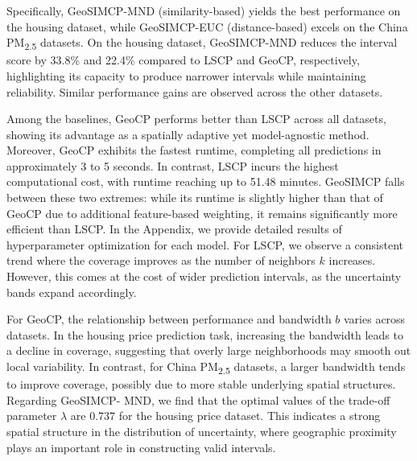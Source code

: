 \documentclass[authoryear,preprint,review,12pt]{elsarticle}
\begin{document}
Specifically, GeoSIMCP-MND (similarity-based) yields the best performance on the housing dataset, while GeoSIMCP-EUC (distance-based) excels on the China PM\textsubscript{2.5} datasets. On the housing dataset, GeoSIMCP-MND reduces the interval score by 33.8\% and 22.4\% compared to LSCP and GeoCP, respectively, highlighting its capacity to produce narrower intervals while maintaining reliability. Similar performance gains are observed across the other datasets.

Among the baselines, GeoCP performs better than LSCP across all datasets, showing its advantage as a spatially adaptive yet model-agnostic method. Moreover, GeoCP exhibits the fastest runtime, completing all predictions in approximately 3 to 5 seconds. In contrast, LSCP incurs the highest computational cost, with runtime reaching up to 51.48 minutes. GeoSIMCP falls between these two extremes: while its runtime is slightly higher than that of GeoCP due to additional feature-based weighting, it remains significantly more efficient than LSCP. In the Appendix, we provide detailed results of hyperparameter optimization for each model. For LSCP, we observe a consistent trend where the coverage improves as the number of neighbors $k$ increases. However, this comes at the cost of wider prediction intervals, as the uncertainty bands expand accordingly.

For GeoCP, the relationship between performance and bandwidth $b$ varies across datasets. In the housing price prediction task, increasing the bandwidth leads to a decline in coverage, suggesting that overly large neighborhoods may smooth out local variability. In contrast, for China PM\textsubscript{2.5} datasets, a larger bandwidth tends to improve coverage, possibly due to more stable underlying spatial structures.
Regarding GeoSIMCP- MND, we find that the optimal values of the trade-off parameter $\lambda$ are $0.737$ for the housing price dataset. This indicates a strong spatial structure in the distribution of uncertainty, where geographic proximity plays an important role in constructing valid intervals.
\end{document}
